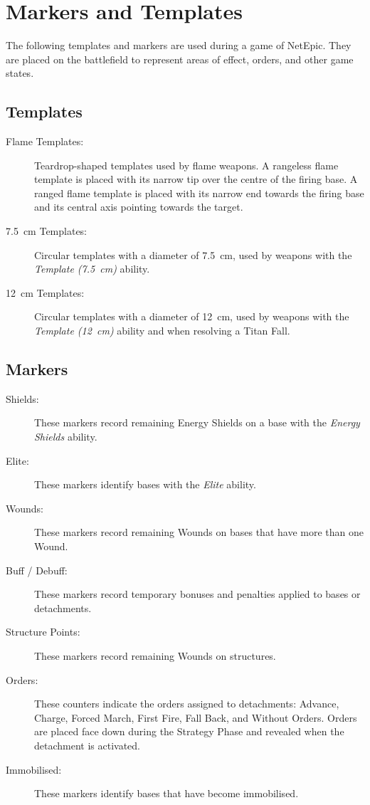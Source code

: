 \section{Markers and Templates}

The following templates and markers are used during a game of NetEpic. They are placed on the battlefield to represent areas of effect, orders, and other game states.

\subsection{Templates}

\begin{description}
    \item[Flame Templates:] Teardrop-shaped templates used by flame weapons. A rangeless flame template is placed with its narrow tip over the centre of the firing base. A ranged flame template is placed with its narrow end towards the firing base and its central axis pointing towards the target.

    \item[7.5~cm Templates:] Circular templates with a diameter of 7.5~cm, used by weapons with the \textit{Template (7.5~cm)} ability.

    \item[12~cm Templates:] Circular templates with a diameter of 12~cm, used by weapons with the \textit{Template (12~cm)} ability and when resolving a Titan Fall.
\end{description}

\subsection{Markers}

\begin{description}
    \item[Shields:] These markers record remaining Energy Shields on a base with the \textit{Energy Shields} ability.

    \item[Elite:] These markers identify bases with the \textit{Elite} ability.

    \item[Wounds:] These markers record remaining Wounds on bases that have more than one Wound.

    \item[Buff / Debuff:] These markers record temporary bonuses and penalties applied to bases or detachments.

    \item[Structure Points:] These markers record remaining Wounds on structures.

    \item[Orders:] These counters indicate the orders assigned to detachments: Advance, Charge, Forced March, First Fire, Fall Back, and Without Orders. Orders are placed face down during the Strategy Phase and revealed when the detachment is activated.

    \item[Immobilised:] These markers identify bases that have become immobilised.
\end{description}

